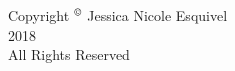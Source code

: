 \documentclass[hyperpdf,oneside,bindnopdf,usenames,dvipsnames,svgnames,table,longbibliography]{hepthesis}
\begin{document}
\begin{frontmatter}
\begin{center}
\end{center}
\thispagestyle{empty}
\let\cleardoublepage\clearpage

\vspace*{8cm}
\begin{center}
    Copyright $\textsuperscript{\textcopyright}$ Jessica Nicole Esquivel\\
    2018\\
    All Rights Reserved\\
\end{center}
\thispagestyle{empty}
\let\cleardoublepage\clearpage

% 
  
\end{frontmatter}

\begin{mainmatter}
  
  
  
  
  
  
  
  
  
\end{mainmatter}


\begin{backmatter}
  
\end{backmatter}




\renewcommand{\appendixname}{Curriculum Vitae}
\setcounter{chapter}{0}
\setcounter{page}{127}
\renewcommand{\thechapter}{}
\renewcommand\thesection{\arabic{section}}
\begin{appendices}
  
\end{appendices}
%  

\end{document}
